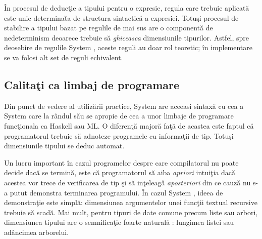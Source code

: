 \begin{remark}
\^ In procesul de deduc\c tie a tipului pentru o expresie, regula care trebuie aplicat\u a este unic determina\u ta de structura sintactic\u a a expresiei. Totu\c si procesul de stabilire a tipului bazat pe regulile de mai sus are o component\u a de nedeterminism deoarece trebuie s\u a \emph{ghiceasca} dimensiunile tipurilor. Astfel, spre deosebire de regulile System \frec, aceste reguli au doar rol teoretic; \^ in implementare se va folosi alt set de reguli echivalent.
\end{remark}

\subsection{Calita\c ti ca limbaj de programare}

Din punct de vedere al utiliz\u arii practice, System \fhat are aceeasi sintax\u a cu cea a System \frec ca\-re la r\^ andul s\u au se apropie de cea a unor limbaje de programare func\c tionala ca Haskell sau ML. O diferen\c t\u a major\u a fa\c t\u a de acastea este faptul c\u a programatorul trebuie s\u a adnoteze programele cu informa\c tii de tip. Totu\c si dimensiunile tipului se deduc automat.

Un lucru important \^ in cazul programelor despre care compilatorul nu poate decide dac\u a se termin\u a, este c\u a programatorul s\u a aiba \emph{apriori} intui\c tia dac\u a acestea vor trece de verificarea de tip \c si s\u a in\c teleag\u a \emph{aposteriori} din ce cauz\u a nu s-a putut demonstra terminarea programului. \^ In cazul System \fhat, ideea de demonstra\c tie este simpl\u a: dimensiunea argumentelor unei func\c tii textual recursive trebuie s\u a scad\u a. Mai mult, pentru tipuri de date comune precum liste sau arbori, dimensiunea tipului are o semnifica\c tie foarte natural\u a : lungimea listei sau ad\^ ancimea arborelui.

\done{}

